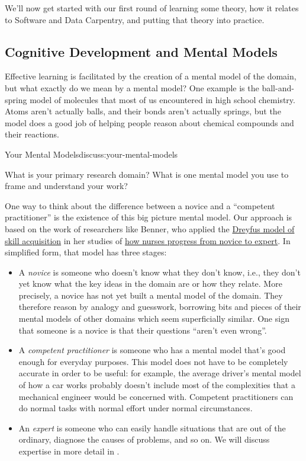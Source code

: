 
We'll now get started with our first round of learning some theory, how
it relates to Software and Data Carpentry, and putting that theory into
practice.

\subsection{Cognitive Development and Mental
Models}\label{cognitive-development-and-mental-models}

Effective learning is facilitated by the creation of a mental model of
the domain, but what exactly do we mean by a mental model? One example
is the ball-and-spring model of molecules that most of us encountered in
high school chemistry. Atoms aren't actually balls, and their bonds
aren't actually springs, but the model does a good job of helping people
reason about chemical compounds and their reactions.

\begin{discussion}{Your Mental Models}{discuss:your-mental-models}

What is your primary research domain? What is one mental model you use
to frame and understand your work?
\end{discussion}

One way to think about the difference between a novice and a ``competent
practitioner'' is the existence of this big picture mental model. Our
approach is based on the work of researchers like Benner, who applied
the
\href{https://en.wikipedia.org/wiki/Dreyfus\_model\_of\_skill\_acquisition}{Dreyfus
model of skill acquisition} in her studies of
\href{http://www.amazon.com/Novice-Expert-Excellence-Clinical-Practice/dp/020100299X/}{how
nurses progress from novice to expert}. In simplified form, that model
has three stages:

\begin{itemize}
\itemsep1pt\parskip0pt
\item
  A \emph{novice} is someone who doesn't know what they don't know,
  i.e., they don't yet know what the key ideas in the domain are or how
  they relate. More precisely, a novice has not yet built a mental model
  of the domain. They therefore reason by analogy and guesswork,
  borrowing bits and pieces of their mental models of other domains
  which seem superficially similar. One sign that someone is a novice is
  that their questions ``aren't even wrong''.
\item
  A \emph{competent practitioner} is someone who has a mental model
  that's good enough for everyday purposes. This model does not have to
  be completely accurate in order to be useful: for example, the average
  driver's mental model of how a car works probably doesn't include most
  of the complexities that a mechanical engineer would be concerned
  with. Competent practitioners can do normal tasks with normal effort
  under normal circumstances.
\item
  An \emph{expert} is someone who can easily handle situations that are
  out of the ordinary, diagnose the causes of problems, and so on. We
  will discuss expertise in more detail in .
\end{itemize}

